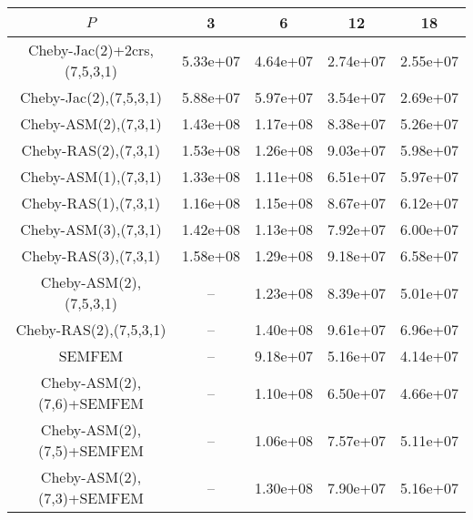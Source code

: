 \begin{table*}
\centering
\begin{tabular}{||c||cccc||}
	\hline
	$P$ & 3 & 6 & 12 & 18 \\
	\hline\hline
	Cheby-Jac(2)+2crs,(7,5,3,1)	&	5.33e+07	&	4.64e+07	&	2.74e+07	&	2.55e+07\\
	Cheby-Jac(2),(7,5,3,1)	&	5.88e+07	&	5.97e+07	&	3.54e+07	&	2.69e+07\\
	Cheby-ASM(2),(7,3,1)	&	1.43e+08	&	1.17e+08	&	8.38e+07	&	5.26e+07\\
	Cheby-RAS(2),(7,3,1)	&	1.53e+08	&	1.26e+08	&	9.03e+07	&	5.98e+07\\
	Cheby-ASM(1),(7,3,1)	&	1.33e+08	&	1.11e+08	&	6.51e+07	&	5.97e+07\\
	Cheby-RAS(1),(7,3,1)	&	1.16e+08	&	1.15e+08	&	8.67e+07	&	6.12e+07\\
	Cheby-ASM(3),(7,3,1)	&	1.42e+08	&	1.13e+08	&	7.92e+07	&	6.00e+07\\
	Cheby-RAS(3),(7,3,1)	&	1.58e+08	&	1.29e+08	&	9.18e+07	&	6.58e+07\\
	Cheby-ASM(2),(7,5,3,1)	&	 --	&	1.23e+08	&	8.39e+07	&	5.01e+07\\
	Cheby-RAS(2),(7,5,3,1)	&	 --	&	1.40e+08	&	9.61e+07	&	6.96e+07\\
	SEMFEM	&	 --	&	9.18e+07	&	5.16e+07	&	4.14e+07\\
	Cheby-ASM(2),(7,6)+SEMFEM	&	 --	&	1.10e+08	&	6.50e+07	&	4.66e+07\\
	Cheby-ASM(2),(7,5)+SEMFEM	&	 --	&	1.06e+08	&	7.57e+07	&	5.11e+07\\
	Cheby-ASM(2),(7,3)+SEMFEM	&	 --	&	1.30e+08	&	7.90e+07	&	5.16e+07\\
\hline
\end{tabular}
\caption{\label{table:foobar}}
\end{table*}
